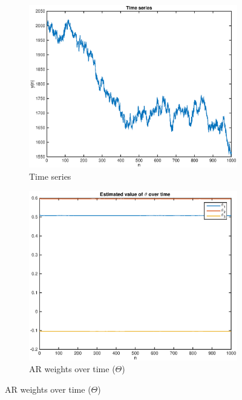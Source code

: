 \documentclass[12pt]{article}
\begin{document}
  \begin{figure}
    \centering
    \begin{subfigure}[b]{0.45\textwidth}
      \includegraphics[width=\textwidth]{figures/artificial_ts.eps}
      \caption{Time series}
      \label{fig:artificial_ts}
    \end{subfigure}
    \begin{subfigure}[b]{0.45\textwidth}
      \includegraphics[width=\textwidth]{figures/artificial_theta.eps}
      \caption{AR weights over time ($\Theta$)}
      \label{fig:artificial_theta}
    \end{subfigure}

\end{figure}
\end{document}
